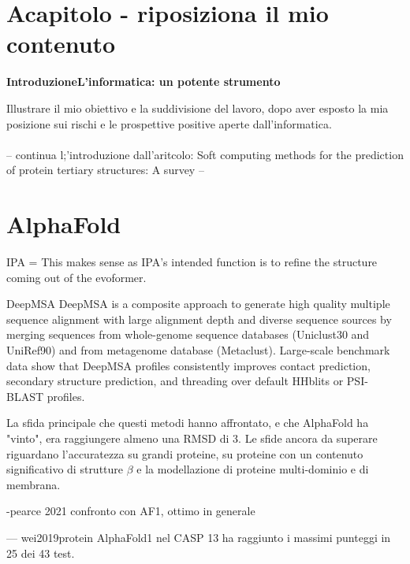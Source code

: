 \chapter{Acapitolo - riposiziona il mio contenuto}


\textbf{{\LARGE Introduzione\newline\newline L'informatica: un potente strumento}}
\vspace{1cm}

Illustrare il mio obiettivo e la suddivisione del lavoro, dopo aver esposto la mia posizione sui rischi e le prospettive positive aperte dall'informatica.\\\\


-- continua l;'introduzione dall'aritcolo: Soft computing methods for the prediction of protein tertiary
structures: A survey --



\chapter{AlphaFold}



IPA = This makes sense as IPA’s intended function is to refine the structure coming out of the evoformer. 

DeepMSA 
DeepMSA is a composite approach to generate high quality multiple sequence alignment with large alignment depth and diverse sequence sources by merging sequences from whole-genome sequence databases (Uniclust30 and UniRef90) and from metagenome database (Metaclust). Large-scale benchmark data show that DeepMSA profiles consistently improves contact prediction, secondary structure prediction, and threading over default HHblits or PSI-BLAST profiles. 



\par La sfida principale che questi metodi hanno affrontato, e che AlphaFold ha "vinto", era raggiungere almeno una RMSD di 3\angstrom. Le sfide ancora da superare riguardano l'accuratezza su grandi proteine, su proteine con un contenuto significativo di strutture $\beta$ e la modellazione di proteine multi-dominio e di membrana.


-pearce 2021 confronto con AF1, ottimo in generale

--- wei2019protein
AlphaFold1 nel CASP 13 ha raggiunto i massimi punteggi in 25 dei 43 test.

